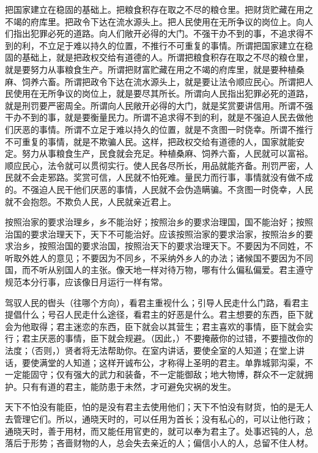 \documentclass[12pt,UTF-8,openany,a4]{ctexbook}
\begin{document}
\begin{large}
    把国家建立在稳固的基础上。把粮食积存在取之不尽的粮仓里。把财货贮藏在用之不竭的府库里。把政令下达在流水源头上。把人民使用在无所争议的岗位上。向人们指出犯罪必死的道路。向人们敞开必得的大门。不强干办不到的事，不追求得不到的利，不立足于难以持久的位置，不推行不可重复的事情。所谓把国家建立在稳固的基础上，就是把政权交给有道德的人。所谓把粮食积存在取之不尽的粮仓里，就是要努力从事粮食生产。所谓把财富贮藏在用之不竭的府库里，就是要种植桑麻、饲养六畜。所谓把政令下达在流水源头上，就是要让法令顺应民心。所谓把人民使用在无所争议的岗位上，就是要尽其所长。所谓向人民指出犯罪必死的道路，就是刑罚要严密周全。所谓向人民敞开必得的大门，就是奖赏要讲信用。所谓不强干办不到的事，就是要衡量民力。所谓不追求得不到的利，就是不强迫人民去做他们厌恶的事情。所谓不立足于难以持久的位置，就是不贪图一时侥幸。所谓不推行不可重复的事情，就是不欺骗人民。这样，把政权交给有道德的人，国家就能安定。努力从事粮食生产，民食就会充足。种植桑麻、饲养六畜，人民就可以富裕。顺应民心，法令就可以贯彻实行。使人民各尽所长，用品就能齐备。刑罚严密，人民就不会走邪路。奖赏可信，人民就不怕死难。量民力而行事，事情就没有做不成的。不强迫人民干他们厌恶的事情，人民就不会伪造瞒骗。不贪图一时侥幸，人民就不会抱怨。不欺负人民，人民就亲近君上。
    
    按照治家的要求治理乡，乡不能治好；按照治乡的要求治理国，国不能治好；按照治国的要求治理天下，天下不可能治好。应该按照治家的要求治家，按照治乡的要求治乡，按照治国的要求治国，按照治天下的要求治理天下。不要因为不同姓，不听取外姓人的意见；不要因为不同乡，不采纳外乡人的办法；诸候国不要因为不同国，而不听从别国人的主张。像天地一样对待万物，哪有什么偏私偏爱。君主遵守规范本分行事，应该像日月运行一样有常。
    
    驾驭人民的辔头（往哪个方向），看君主重视什么；引导人民走什么门路，看君主提倡什么；号召人民走什么途径，看君主的好恶是什么。君主想要的东西，臣下就会为他取得；君主迷恋的东西，臣下就会以其营生；君主喜欢的事情，臣下就会实行；君主厌恶的事情，臣下就会规避。（因此，）不要掩蔽你的过错，不要擅改你的法度；（否则，）贤者将无法帮助你。在室内讲话，要使全室的人知道；在堂上讲话，要使满堂的人知道；这样开诚布公，才称得上圣明的君主。单靠城郭沟渠，不一定能固守；仅有强大的武力和装备，不一定能御敌；地大物博，群众不一定就拥护。只有有道的君主，能防患于未然，才可避免灾祸的发生。
    
    天下不怕没有能臣，怕的是没有君主去使用他们；天下不怕没有财货，怕的是无人去管理它们。所以，通晓天时的，可以任用为首长；没有私心的，可以让他行政；通晓天时，善于用材，而又能任用官吏的，就可以奉为君主了。处事迟钝的人，总落后于形势；吝啬财物的人，总会失去亲近的人；偏信小人的人，总留不住人材。
    
\end{large}
\end{document}
